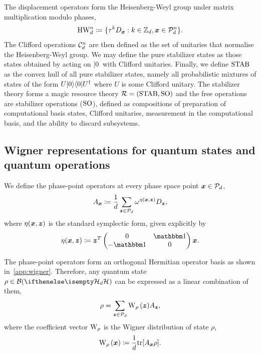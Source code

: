 \documentclass[pra,
aps,
twocolumn,
superscriptaddress,
groupedaddress,
nofootinbib,
reprint
]{revtex4-1}
\begin{document}
The displacement operators form the Heisenberg-Weyl group  under matrix multiplication modulo phases,
\begin{equation}\label{eq:gp}
    {\rm{HW}}_d^n \coloneqq \{ \tau^k D_{\bmx}: k \in \mathbb{Z}_d, \bmx \in \cal{P}_d^n\}.
\end{equation}
The Clifford operations $ \cal{C}_d^n $ are then defined as the set of unitaries that normalise the Heisenberg-Weyl group. We may define the pure stabilizer states as those states obtained by acting on $|0\>$ with Clifford unitaries. Finally, we define $\stab$ as the convex hull of all pure stabilizer states, namely all probabilistic mixtures of states of the form $U|0\>\<0|U^\dagger$ where $U$ is some Clifford unitary. The stabilizer theory forms a magic resource theory $\R = (\stab, \so)$
and the free operations are stabilizer operations ($\so$), defined as compositions of preparation of computational basis states, Clifford unitaries, measurement in the computational basis, and the ability to discard subsystems.

\subsection{Wigner representations for quantum states and quantum operations}\label{sec:wigner}

We define the phase-point operators at every phase space point $\bmx \in \cal{P}_d$,
\begin{align}
	A_{\bmx} \coloneqq \frac{1}{d} \sum_{\bmz \in \cal{P}_d} \omega^{\eta(\bmx, \bmz)} D_{\bmz}, \label{eq:ax}
\end{align}
where $\eta(\bmx, \bmz)$ is the standard symplectic form, given explicitly by
\begin{equation}
	\eta(\bmx, \bmz) \coloneqq \bmz^T \begin{pmatrix}
		0  & \id \\ %
		-\id & 0 \\ %
	\end{pmatrix} \bmx.
\end{equation}

The phase-point operators form an orthogonal Hermitian operator basis as shown in~\cref{app:wigner}.
Therefore, any quantum state $\rho \in \cal{B}(\hd)$ can be expressed as a linear combination of them,
\begin{equation}
    \rho = \sum_{\bmz \in \cal{P}_d} \W[\bmz]{\rho} A_{\bmz},
\end{equation}
where the coefficient vector $\W{\rho}$ is the Wigner distribution of state $\rho$,
\begin{equation}\label{eq:wstate}
    \W[\bmx]{\rho} \coloneqq \frac{1}{d}\tr[A_{\bmx} \rho].
\end{equation}
\end{document}
